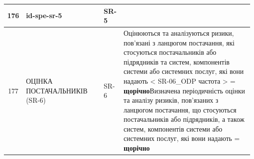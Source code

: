 \documentclass[10pt]{article}
\begin{document}
\begin{longtable}{|c|>{\raggedright\arraybackslash}p{4cm}|>{\raggedright\arraybackslash}p{2.5cm}|>{\raggedright\arraybackslash}p{3.5cm}|>{\raggedright\arraybackslash}p{5.5cm}|}
176 & id-spe-sr-5 &  & SR-5 &  \\ \hline
177 & ОЦІНКА ПОСТАЧАЛЬНИКІВ (SR-6) &  & SR-6 & Оцінюються та аналізуються ризики, пов'язані з ланцюгом постачання, які стосуються постачальників або підрядників та систем, компонентів системи або системних послуг, які вони надають < SR-06\_\allowbreak{}ODP частота > = \textbf{щорічно}\newline Визначена періодичність оцінки та аналізу ризиків, пов'язаних з ланцюгом постачання, що стосуються постачальників або підрядників, а також систем, компонентів системи або системних послуг, які вони надають = \textbf{щорічно} \\ \hline


\end{longtable}
\end{document}
